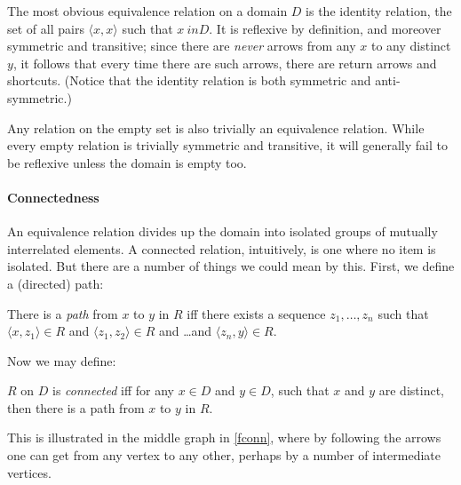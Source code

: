 The most obvious equivalence relation on a domain $D$ is the identity relation, the set of all pairs $\langle x, x\rangle$ such that $x\ in D$. It is reflexive by definition, and moreover symmetric and transitive; since there are \emph{never} arrows from any $x$ to any distinct $y$, it follows that every time there are such arrows, there are return arrows and shortcuts. (Notice that the identity relation is both symmetric and anti-symmetric.)

Any relation on the empty set is also trivially an equivalence relation. While every empty relation is trivially symmetric and transitive, it will generally fail to be reflexive unless the domain is empty too.

\paragraph{Connectedness}
An equivalence relation divides up the domain into isolated groups of mutually interrelated elements. A connected relation, intuitively, is one where no item is isolated. But there are a number of things we could mean by this. First, we define a (directed) path: \begin{definition}[Path]
  There is a \emph{path} from $x$ to $y$ in $R$ iff there exists a sequence $z_{1},\ldots,z_{n}$ such that $\langle x,z_{1}\rangle \in R$ and
  $\langle z_{1},z_{2}\rangle \in R$ and \ldots and $\langle z_{n},y\rangle \in R$.
\end{definition}
Now we may define: \begin{definition}
  $R$ on $D$ is \emph{connected} iff for any $x \in D$ and $y \in D$, such that $x$ and $y$ are distinct, then there is a path from $x$ to $y$ in $R$. 
 \end{definition} This is illustrated in the middle graph in \autoref{fconn}, where by following the arrows one can get from any vertex to any other, perhaps by a number of intermediate vertices.

